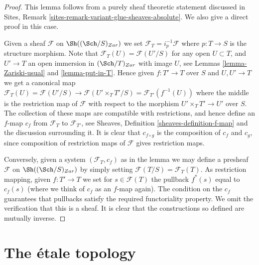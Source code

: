 \begin{proof}
This lemma follows from a purely sheaf theoretic statement discussed
in Sites, Remark \ref{sites-remark-variant-glue-sheaves-absolute}.
We also give a direct proof in this case.

\medskip\noindent
Given a sheaf $\mathcal{F}$ on $\Sh((\Sch/S)_{Zar})$
we set $\mathcal{F}_T = i_p^{-1}\mathcal{F}$ where $p : T \to S$
is the structure morphism. Note that
$\mathcal{F}_T(U) = \mathcal{F}(U'/S)$ for any open $U \subset T$,
and $U' \to T$ an open immersion in $(\Sch/T)_{Zar}$
with image $U$, see Lemmas \ref{lemma-Zariski-usual} and \ref{lemma-put-in-T}.
Hence given $f : T' \to T$ over $S$ and $U, U' \to T$ we get a canonical
map $\mathcal{F}_T(U) = \mathcal{F}(U'/S) \to \mathcal{F}(U'\times_T T'/S)
= \mathcal{F}_{T'}(f^{-1}(U))$ where the middle is the restriction map
of $\mathcal{F}$ with respect to the morphism
$U' \times_T T' \to U'$ over $S$. The collection of these maps are
compatible with restrictions, and hence define an $f$-map $c_f$
from $\mathcal{F}_T$ to $\mathcal{F}_{T'}$, see
Sheaves, Definition \ref{sheaves-definition-f-map} and the discussion
surrounding it. It is clear that $c_{f \circ g}$ is the composition of
$c_f$ and $c_g$, since composition of restriction maps of $\mathcal{F}$
gives restriction maps.

\medskip\noindent
Conversely, given a system $(\mathcal{F}_T, c_f)$ as in the lemma
we may define a presheaf $\mathcal{F}$ on $\Sh((\Sch/S)_{Zar})$
by simply setting $\mathcal{F}(T/S) = \mathcal{F}_T(T)$. As restriction
mapping, given $f : T' \to T$ we set for $s \in \mathcal{F}(T)$
the pullback $f^*(s)$ equal to $c_f(s)$ (where we think of $c_f$ as
an $f$-map again). The condition on the $c_f$ guarantees that
pullbacks satisfy the required functoriality property.
We omit the verification that this is a sheaf.
It is clear that the constructions so defined are mutually inverse.
\end{proof}























\section{The \'etale topology}
\label{section-etale}

